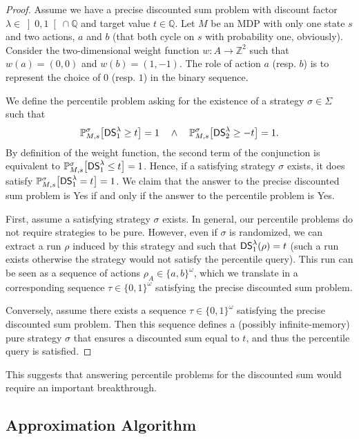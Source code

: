\documentclass{llncs}
\newcommand{\integ}{\ensuremath{\mathbb{Z}} }
\newcommand{\strat}{\ensuremath{\sigma} }
\newcommand*{\pr}{\mathbb{P}}
\newcommand{\discSum}[1]{\ensuremath{{\sf DS}^{#1}} }
\newcommand{\discount}{\ensuremath{\lambda} }
\newcommand{\rat}{\ensuremath{\mathbb{Q}} }
\newcommand{\strats}{\ensuremath{\Sigma} }
\begin{document}
\begin{proof}
Assume we have a precise discounted sum problem with discount factor $\discount \in \left] 0, 1\right[ \cap \rat$ and target value $t \in \rat$. Let $M$ be an MDP with only one state $s$ and two actions, $a$ and $b$ (that both cycle on $s$ with probability one, obviously). Consider the two-dimensional weight function $w\colon A \rightarrow \integ^{2}$ such that $w(a) = (0, 0)$ and $w(b) = (1, -1)$. The role of action $a$ (resp. $b$) is to represent the choice of $0$ (resp. $1$) in the binary sequence.

We define the percentile problem asking for the existence of a strategy $\strat \in \strats$ such that
\begin{equation*}
\pr_{M,s}^\strat \big[\discSum{\discount}_{1} \geq t\big] = 1\quad \wedge \quad \pr_{M,s}^\strat \big[\discSum{\discount}_{2} \geq -t\big] = 1.
\end{equation*}
By definition of the weight function, the second term of the conjunction is equivalent to $\pr_{M,s}^\strat \big[\discSum{\discount}_{1} \leq t\big] = 1$. Hence, if a satisfying strategy $\strat$ exists, it does satisfy $\pr_{M,s}^\strat \big[\discSum{\discount}_{1} = t\big] = 1$. We claim that the answer to the precise discounted sum problem is \textsf{Yes} if and only if the answer to the percentile problem is \textsf{Yes}.

First, assume a satisfying strategy $\strat$ exists. In general, our percentile problems do not require strategies to be pure. However, even if $\strat$ is randomized, we can extract a run $\rho$ induced by this strategy and such that $\discSum{\discount}_{1}(\rho) = t$ (such a run exists otherwise the strategy would not satisfy the percentile query). This run can be seen as a sequence of actions $\rho_{A} \in \{a, b\}^{\omega}$, which we translate in a corresponding sequence $\tau \in \{0, 1\}^{\omega}$ satisfying the precise discounted sum problem.

Conversely, assume there exists a sequence $\tau \in \{0, 1\}^{\omega}$ satisfying the precise discounted sum problem. Then this sequence defines a (possibly infinite-memory) pure strategy $\strat$ that ensures a discounted sum equal to $t$, and thus the percentile query is satisfied.
\end{proof}

This suggests that answering percentile problems for the discounted sum would require an important breakthrough.

\subsection{Approximation Algorithm}
\label{subsec:approx}
\end{document}
